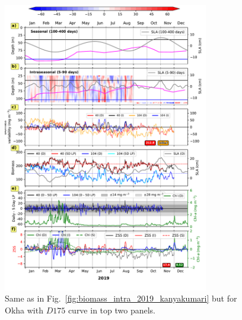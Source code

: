 \documentclass[12pt,a4paper]{article}
\begin{document}
\begin{figure}[htbp]
	\centering
	\includegraphics[width=0.8\textwidth]{./fig_s09_biomass_intra_2019_okha.pdf} 
	\caption{Same as in Fig.~\ref{fig:biomass_intra_2019_kanyakumari} but for Okha with $D175$ curve in top two panels.}		
	\label{fig:biomass_intra_2019_okha}
\end{figure}
\end{document}
